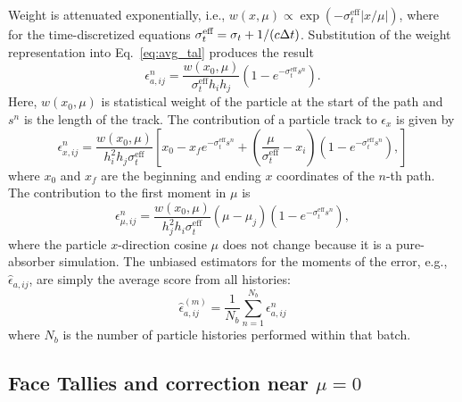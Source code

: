 Weight is attenuated exponentially, i.e., $w(x,\mu)\propto
\exp(-\sigma_{t}^{\text{eff}}|x/\mu|)$, where for the time-discretized equations
$\sigma_{t}^{\text{eff}}=\sigma_t + 1/(c\Delta t)$. Substitution of the weight representation into
Eq.~\eqref{eq:avg_tal} produces the result
\begin{equation}
    \epsilon^n_{a,ij} = \frac{w(x_0,\mu)}{\sigma_{t}^{\text{eff}} h_i h_j} \left(1 -
    e^{-\sigma_{t}^{\text{eff}}s^n}\right).
\end{equation}
Here, $w(x_0,\mu)$ is statistical weight of the particle at the start of the path and $s^n$ is the
length of the track. The contribution of a
particle track to $\epsilon_x$ is given by
\begin{equation}
    \epsilon^n_{x,ij} = \frac{w(x_0,\mu)}{h_i^2h_j \sigma_{t}^{\text{eff}}} \left[x_0 - x_f e^{-\sigma_{t}^{\text{eff}} s^n}
        + \left(\frac{\mu}{\sigma_{t}^{\text{eff}}} - x_i \right)\left(1-e^{-\sigma_{t}^{\text{eff}} s^n}\right),
    \right]
\end{equation}
where $x_0$ and $x_f$ are the beginning and ending $x$ coordinates of the $n$-th
path.  The contribution to the first moment in $\mu$ is 
\begin{equation}
    \epsilon^n_{\mu,ij} = \frac{w(x_0,\mu)}{h_{j}^2h_i\sigma_{t}^{\text{eff}}}\left(\mu -
    \mu_j\right) \left(1 - e^{-\sigma_{t}^{\text{eff}}s^n}\right),
\end{equation}
where the particle $x$-direction cosine $\mu$ does not change because it is a pure-absorber simulation.
The unbiased estimators for the moments of the error, e.g., $\hat \epsilon_{a,ij}$, are simply the
average score from all histories:
\begin{equation}
    \hat\epsilon_{a,ij}^{(m)}  = \frac{1}{N_b} \sum\limits_{n=1}^{N_b} \epsilon^n_{a,ij}
\end{equation}
where $N_b$ is the number of particle histories performed within that batch.


\subsection{Face Tallies and correction near $\mu=0$}
\label{sec:face_tallies}

